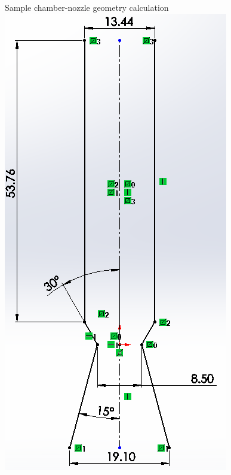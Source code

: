 \documentclass{beamer}
\begin{document}
\begin{frame}{Sample chamber-nozzle geometry calculation}
    \centering \includegraphics[height = 0.85\textheight]{images/sample_chamber_nozzle_geometry.png}
\end{frame}

\end{document}
